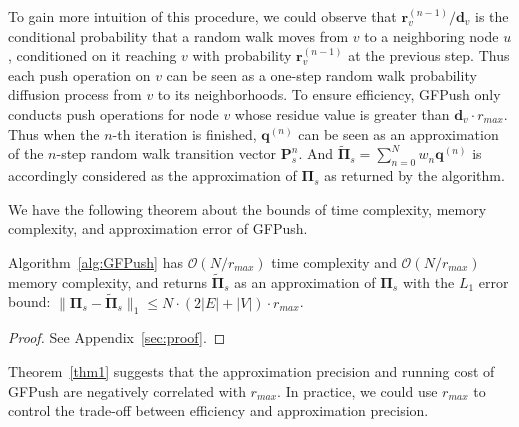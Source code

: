 To gain more intuition of this procedure, we could observe that $\mathbf{r}^{(n-1)}_v/\mathbf{d}_v$ is the conditional probability that a random walk moves from $v$ to a neighboring node $u$, conditioned on it reaching $v$ with probability $\mathbf{r}^{(n-1)}_v$ at the previous step. Thus each push operation on $v$ can be seen as a one-step random walk probability diffusion process from $v$ to its neighborhoods. To ensure efficiency, GFPush only conducts push operations for node $v$ whose residue value is greater than $\mathbf{d}_v \cdot r_{max}$. Thus when the $n$-th iteration is finished, $\mathbf{q}^{(n)}$ can be seen as an approximation of the $n$-step random walk transition vector $\mathbf{P}^n_s$. And  $\widetilde{\mathbf{\Pi}}_s=\sum_{n=0}^N w_n\mathbf{q}^{(n)}$ is accordingly considered as the approximation of $\mathbf{\Pi}_s$ as returned by the algorithm. 

 We have the following theorem about the bounds of time complexity, memory complexity, and approximation error of GFPush.

 \begin{thm}
 \label{thm1}
 Algorithm~\ref{alg:GFPush} has  $\mathcal{O}(N/r_{max})$  time complexity and $\mathcal{O}(N/r_{max})$ memory complexity, and returns $\widetilde{\mathbf{\Pi}}_s$ as an approximation of $\mathbf{\Pi}_s$ with the $L_1$ error bound: $\parallel\mathbf{\Pi}_s - \widetilde{\mathbf{\Pi}}_s\parallel_1 \leq N\cdot (2|E| +|V|) \cdot r_{max}$.
 \end{thm}
 
 \begin{proof}
 See Appendix~\ref{sec:proof}.
 \end{proof}
 
Theorem~\ref{thm1} 
suggests that 
the approximation precision and running cost of GFPush are negatively correlated with $r_{max}$. In practice, we could use $r_{max}$ to control the trade-off between efficiency and approximation precision.
 
